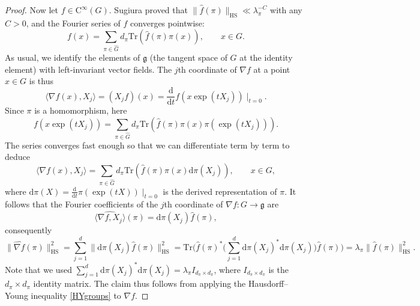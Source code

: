 \documentclass[11pt,a4paper]{article}
\theoremstyle{definition}
\begin{document}
\begin{proof}
Now let $f \in \mathrm{C}^{\infty} (G)$. Sugiura \cite{SU} proved that $\| \widehat{f}(\pi) \|_{\mathrm{HS}} \ll \lambda_{\pi}^{-C}$ with any $C>0$, and the Fourier series of $f$ converges pointwise:
\[ f(x) = \sum_{\pi \in \widehat{G}} d_{\pi} \mathrm{Tr} \left( \widehat{f}(\pi) \pi (x) \right) , \qquad x \in G. \]
As usual, we identify the elements of $\mathfrak{g}$ (the tangent space of $G$ at the identity element) with left-invariant vector fields. The $j$th coordinate of $\nabla f$ at a point $x \in G$ is thus
\[ \langle \nabla f (x), X_j \rangle = (X_j f)(x) = \frac{\mathrm{d}}{\mathrm{d}t} f \left( x \exp (t X_j) \right) \mid_{t=0} . \]
Since $\pi$ is a homomorphism, here
\[ f \left( x \exp (t X_j) \right) = \sum_{\pi \in \widehat{G}} d_{\pi} \mathrm{Tr} \left( \widehat{f}(\pi) \pi (x) \pi (\exp (t X_j)) \right) . \]
The series converges fast enough so that we can differentiate term by term to deduce
\[ \langle \nabla f (x), X_j \rangle = \sum_{\pi \in \widehat{G}} d_{\pi} \mathrm{Tr} \left( \widehat{f}(\pi) \pi (x) \mathrm{d} \pi (X_j) \right) , \qquad x \in G, \]
where $\mathrm{d}\pi (X)= \frac{\mathrm{d}}{\mathrm{d}t} \pi (\exp (tX)) \mid_{t=0}$ is the derived representation of $\pi$. It follows that the Fourier coefficients of the $j$th coordinate of $\nabla f: G \to \mathfrak{g}$ are
\[ \widehat{\langle \nabla f, X_j \rangle} (\pi) = \mathrm{d} \pi (X_j) \widehat{f}(\pi) , \]
consequently
\[ \| \widehat{\nabla f} (\pi) \|_{\mathrm{HS}}^2 = \sum_{j=1}^d \| \mathrm{d} \pi (X_j) \widehat{f}(\pi) \|_{\mathrm{HS}}^2 = \mathrm{Tr} \Bigg( \widehat{f}(\pi)^* \Bigg( \sum_{j=1}^d \mathrm{d} \pi (X_j)^* \mathrm{d} \pi (X_j) \Bigg) \widehat{f}(\pi) \Bigg) = \lambda_{\pi} \| \widehat{f}(\pi) \|_{\mathrm{HS}}^2 . \]
Note that we used $\sum_{j=1}^d \mathrm{d} \pi (X_j)^* \mathrm{d} \pi (X_j) = \lambda_{\pi} I_{d_{\pi} \times d_{\pi}}$, where $I_{d_{\pi} \times d_{\pi}}$ is the $d_{\pi} \times d_{\pi}$ identity matrix. The claim thus follows from applying the Hausdorff--Young inequality \eqref{HYgroups} to $\nabla f$.
\end{proof}
\end{document}
